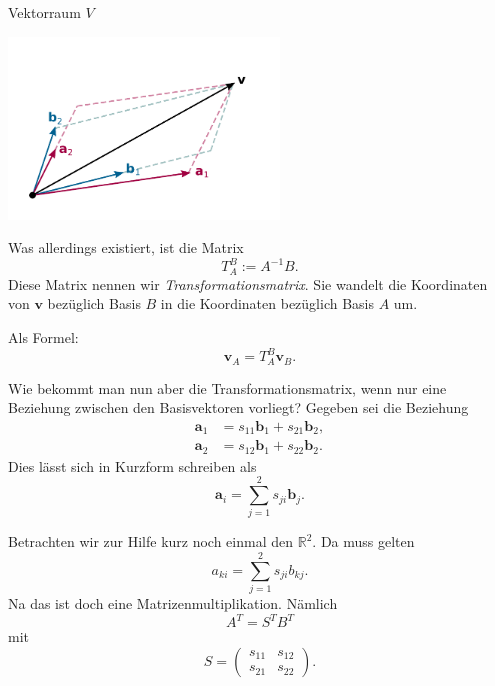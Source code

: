 \documentclass[9pt]{beamer}
\newcommand{\bv}[1]{\mathbf{#1}}
\newcommand{\R}{\mathbb R}
\begin{document}
\begin{frame}
\begin{center}Vektorraum $V$\end{center}

\vspace{-2em}
\begin{center}
\includegraphics[width=72mm]{img/Abstrakt-in-Basis-BA.pdf}
\end{center}
\end{frame}

\begin{frame}
Was allerdings existiert, ist die Matrix
\[T_A^B := A^{-1}B.\]\pause
Diese Matrix nennen wir \emph{Transformationsmatrix}. Sie wandelt die
Koordinaten von $\bv v$ bezüglich Basis $B$ in die Koordinaten
bezüglich Basis $A$ um.\pause

\vspace{0.8em}
Als Formel:
\[\bv v_A = T_A^B \bv v_B.\]
\end{frame}

\begin{frame}
Wie bekommt man nun aber die Transformationsmatrix, wenn nur
eine Beziehung zwischen den Basisvektoren vorliegt? Gegeben sei
die Beziehung
\begin{align*}
\bv a_1 &= s_{11}\bv b_1 + s_{21}\bv b_2,\\
\bv a_2 &= s_{12}\bv b_1 + s_{22}\bv b_2.
\end{align*}\pause
Dies lässt sich in Kurzform schreiben als
\[\bv a_i = \sum_{j=1}^2 s_{ji}\bv b_j.\]
\end{frame}

\begin{frame}
Betrachten wir zur Hilfe kurz noch einmal den $\R^2$.
Da muss gelten
\[a_{ki} = \sum_{j=1}^2 s_{ji}b_{kj}.\]\pause
Na das ist doch eine Matrizenmultiplikation. Nämlich
\[A^T = S^T B^T\]
mit
\[S = \begin{pmatrix}s_{11} & s_{12}\\
s_{21} & s_{22}\end{pmatrix}.\]
\end{frame}
\end{document}
